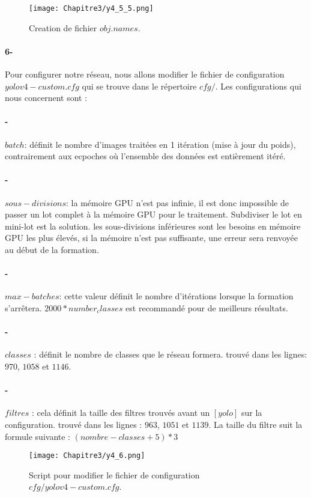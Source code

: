       \begin{figure}[H]
               \centering
               \texttt{[image: Chapitre3/y4\_5\_5.png]}
               \caption{Creation de fichier \(obj.names\).}
               \label{y4_5_5}
               \end{figure}
           
     
     \paragraph{6-} Pour configurer notre réseau, nous allons modifier le fichier de configuration \(yolov4-custom.cfg\) qui se trouve dans le répertoire \(cfg/\). Les configurations qui nous concernent sont :
     \paragraph{-} \(batch\): définit le nombre d'images traitées en 1 itération (mise à jour du poids), contrairement aux ecpoches où l'ensemble des données est entièrement itéré.
     \paragraph{-} \(sous-divisions\): la mémoire GPU n'est pas infinie, il est donc impossible de passer un lot complet à la mémoire GPU pour le traitement. Subdiviser le lot en mini-lot est la solution. les sous-divisions inférieures sont les besoins en mémoire GPU les plus élevés, si la mémoire n'est pas suffisante, une erreur sera renvoyée au début de la formation.
     \paragraph{-} \(max-batches\): cette valeur définit le nombre d'itérations lorsque la formation s'arrêtera. \(2000 * number_classes\) est recommandé pour de meilleurs résultats.
     \paragraph{-} \(classes\) : définit le nombre de classes que le réseau formera. trouvé dans les lignes: $970$, $1058$ et $1146$.
     \paragraph{-} \(filtres\) : cela définit la taille des filtres trouvés avant un $[yolo]$ sur la configuration. trouvé dans les lignes : $963$, $1051$ et $1139$. La taille du filtre suit la formule suivante : $(nombre-classes + 5) * 3$
     \begin{figure}[H]
               \centering
               \texttt{[image: Chapitre3/y4\_6.png]}
               \caption{Script pour modifier le fichier de configuration $cfg/yolov4-custom.cfg$.}
               \label{y4_6}
               \end{figure}
     
